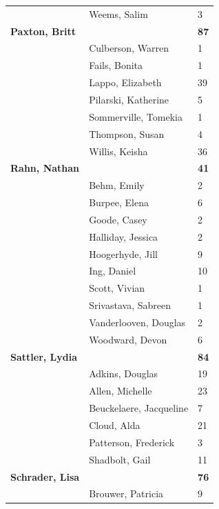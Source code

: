 \documentclass{article}\usepackage[]{graphicx}\usepackage[]{color}
\begin{document}
{\begin{longtable} { >{\raggedright}p{}|p{}p{}}
   & Weems, Salim & 3 \\ 
   \rowcolor[gray]{0.90}\textbf{Paxton, Britt} &  & \hspace{2cm}\textbf{87} \\ 
   \rowcolor[gray]{0.90} & Culberson, Warren & 1 \\ 
   \rowcolor[gray]{0.90} & Fails, Bonita & 1 \\ 
   & Lappo, Elizabeth & 39 \\ 
   & Pilarski, Katherine & 5 \\ 
   & Sommerville, Tomekia & 1 \\ 
   \rowcolor[gray]{0.90} & Thompson, Susan & 4 \\ 
   \rowcolor[gray]{0.90} & Willis, Keisha & 36 \\ 
   \rowcolor[gray]{0.90}\textbf{Rahn, Nathan} &  & \hspace{2cm}\textbf{41} \\ 
   & Behm, Emily & 2 \\ 
   & Burpee, Elena & 6 \\ 
   & Goode, Casey & 2 \\ 
   \rowcolor[gray]{0.90} & Halliday, Jessica & 2 \\ 
   \rowcolor[gray]{0.90} & Hoogerhyde, Jill & 9 \\ 
   \rowcolor[gray]{0.90} & Ing, Daniel & 10 \\ 
   & Scott, Vivian & 1 \\ 
   & Srivastava, Sabreen & 1 \\ 
   & Vanderlooven, Douglas & 2 \\ 
   \rowcolor[gray]{0.90} & Woodward, Devon & 6 \\ 
   \rowcolor[gray]{0.90}\textbf{Sattler, Lydia} &  & \hspace{2cm}\textbf{84} \\ 
   \rowcolor[gray]{0.90} & Adkins, Douglas & 19 \\ 
   & Allen, Michelle & 23 \\ 
   & Beuckelaere, Jacqueline & 7 \\ 
   & Cloud, Alda & 21 \\ 
   \rowcolor[gray]{0.90} & Patterson, Frederick & 3 \\ 
   \rowcolor[gray]{0.90} & Shadbolt, Gail & 11 \\ 
   \rowcolor[gray]{0.90}\textbf{Schrader, Lisa} &  & \hspace{2cm}\textbf{76} \\ 
   & Brouwer, Patricia & 9 \\ 

\end{longtable}}
\end{document}
